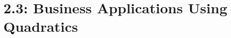 \documentclass[../mathNotesPreamble]{subfiles}
\begin{document}
  \section{2.3: Business Applications Using Quadratics}
    

  \pagebreak
\end{document}
